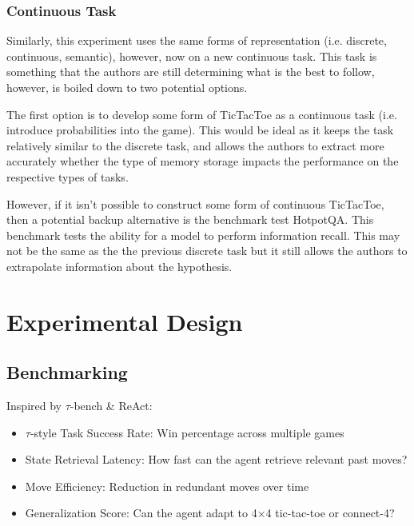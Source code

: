 \documentclass[11pt]{article}
\begin{document}
\subsubsection{Continuous Task}
Similarly, this experiment uses the same forms of representation (i.e. discrete, continuous, semantic), however, now on a new continuous task. This task is something that the authors are still determining what is the best to follow, however, is boiled down to two potential options.

The first option is to develop some form of TicTacToe as a continuous task (i.e. introduce probabilities into the game). This would be ideal as it keeps the task relatively similar to the discrete task, and allows the authors to extract more accurately whether the type of memory storage impacts the performance on the respective types of tasks.

However, if it isn't possible to construct some form of continuous TicTacToe, then a potential backup alternative is the benchmark test HotpotQA. This benchmark tests the ability for a model to perform information recall. This may not be the same as the the previous discrete task but it still allows the authors to extrapolate information about the hypothesis.

\section{Experimental Design}
\subsection{Benchmarking}
Inspired by $\tau$-bench \& ReAct:
\begin{itemize}
    \item $\tau$-style Task Success Rate: Win percentage across multiple games
    \item State Retrieval Latency: How fast can the agent retrieve relevant past moves?
    \item Move Efficiency: Reduction in redundant moves over time
    \item Generalization Score: Can the agent adapt to 4×4 tic-tac-toe or connect-4?
\end{itemize}
\end{document}
